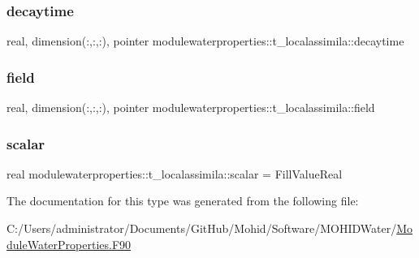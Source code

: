 \subsubsection{\texorpdfstring{decaytime}{decaytime}}
{\footnotesize\ttfamily real, dimension(\+:,\+:,\+:), pointer modulewaterproperties\+::t\+\_\+localassimila\+::decaytime\hspace{0.3cm}{\ttfamily [private]}}

\mbox{\label{structmodulewaterproperties_1_1t__localassimila_ab836eb7187f90628f4c0140782b75510}} 
\subsubsection{\texorpdfstring{field}{field}}
{\footnotesize\ttfamily real, dimension(\+:,\+:,\+:), pointer modulewaterproperties\+::t\+\_\+localassimila\+::field\hspace{0.3cm}{\ttfamily [private]}}

\mbox{\label{structmodulewaterproperties_1_1t__localassimila_a8db719c1676073188dd1aa00e509d776}} 
\subsubsection{\texorpdfstring{scalar}{scalar}}
{\footnotesize\ttfamily real modulewaterproperties\+::t\+\_\+localassimila\+::scalar = Fill\+Value\+Real\hspace{0.3cm}{\ttfamily [private]}}



The documentation for this type was generated from the following file\+:\begin{DoxyCompactItemize}
\item 
C\+:/\+Users/administrator/\+Documents/\+Git\+Hub/\+Mohid/\+Software/\+M\+O\+H\+I\+D\+Water/\mbox{\hyperlink{_module_water_properties_8_f90}{Module\+Water\+Properties.\+F90}}\end{DoxyCompactItemize}

